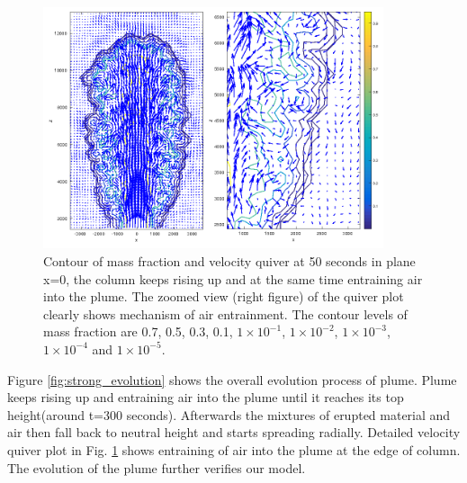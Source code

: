 \documentclass[journal abbreviation, manuscript]{copernicus}
\begin{document}
\begin{figure}
\includegraphics[width=10cm]{t50}
\caption{Contour of mass fraction and velocity quiver at 50 seconds in plane x=0, the column keeps rising up and at the same time entraining air into the plume. The zoomed view (right figure) of the quiver plot clearly shows mechanism of air entrainment. The contour levels of mass fraction are 0.7, 0.5, 0.3, 0.1, $1\times 10 ^{-1}$, $1\times 10 ^{-2}$, $1\times 10 ^{-3}$, $1\times 10^{-4}$ and $1\times 10^{-5}$.}
\label{fig:strong_plume_t50}
\end{figure}
Figure \ref{fig:strong_evolution} shows the overall evolution process of plume. Plume keeps rising up and entraining air into the plume until it reaches its top height(around t=300 seconds). Afterwards the mixtures of erupted material and air then fall back to neutral height and starts spreading radially. Detailed velocity quiver plot in Fig. \ref{fig:strong_plume_t50} shows entraining of air into the plume at the edge of column. The evolution of the plume further verifies our model.
%
\conclusions  \label{sec:conclusion}%
\end{document}
